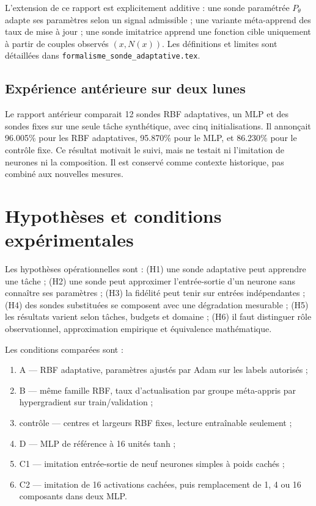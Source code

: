 \documentclass[11pt,a4paper]{article}
\begin{document}
L'extension de ce rapport est explicitement additive : une sonde paramétrée $P_\theta$ adapte ses paramètres selon un signal admissible ; une variante méta-apprend des taux de mise à jour ; une sonde imitatrice apprend une fonction cible uniquement à partir de couples observés $(x,N(x))$. Les définitions et limites sont détaillées dans \texttt{formalisme\_sonde\_adaptative.tex}.

\subsection{Expérience antérieure sur deux lunes}
Le rapport antérieur comparait 12 sondes RBF adaptatives, un MLP et des sondes fixes sur une seule tâche synthétique, avec cinq initialisations. Il annonçait 96.005\% pour les RBF adaptatives, 95.870\% pour le MLP, et 86.230\% pour le contrôle fixe. Ce résultat motivait le suivi, mais ne testait ni l'imitation de neurones ni la composition. Il est conservé comme contexte historique, pas combiné aux nouvelles mesures.

\section{Hypothèses et conditions expérimentales}
Les hypothèses opérationnelles sont : (H1) une sonde adaptative peut apprendre une tâche ; (H2) une sonde peut approximer l'entrée-sortie d'un neurone sans connaître ses paramètres ; (H3) la fidélité peut tenir sur entrées indépendantes ; (H4) des sondes substituées se composent avec une dégradation mesurable ; (H5) les résultats varient selon tâches, budgets et domaine ; (H6) il faut distinguer rôle observationnel, approximation empirique et équivalence mathématique.

Les conditions comparées sont :
\begin{enumerate}[leftmargin=1.1cm]
\item A — RBF adaptative, paramètres ajustés par Adam sur les labels autorisés ;
\item B — même famille RBF, taux d'actualisation par groupe méta-appris par hypergradient sur train/validation ;
\item contrôle — centres et largeurs RBF fixes, lecture entraînable seulement ;
\item D — MLP de référence à 16 unités tanh ;
\item C1 — imitation entrée-sortie de neuf neurones simples à poids cachés ;
\item C2 — imitation de 16 activations cachées, puis remplacement de 1, 4 ou 16 composants dans deux MLP.
\end{enumerate}
\end{document}
